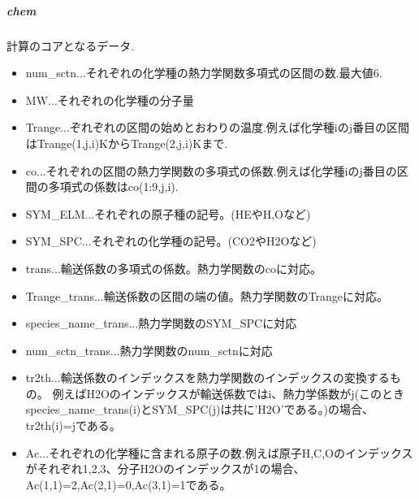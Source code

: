\documentclass{jsarticle}
\begin{document}
\subparagraph{chem}計算のコアとなるデータ.
\begin{itemize}
\item num\_sctn...それぞれの化学種の熱力学関数多項式の区間の数.最大値6.
\item MW...それぞれの化学種の分子量
\item Trange...ぞれぞれの区間の始めとおわりの温度.例えば化学種iのj番目の区間はTrange(1,j,i)KからTrange(2,j,i)Kまで.
\item co...それぞれの区間の熱力学関数の多項式の係数.例えば化学種iのj番目の区間の多項式の係数はco(1:9,j,i).
\item SYM\_ELM...それぞれの原子種の記号。(HEやH,Oなど)
\item SYM\_SPC...それぞれの化学種の記号。(CO2やH2Oなど)
\item trans...輸送係数の多項式の係数。熱力学関数のcoに対応。
\item Trange\_trans...輸送係数の区間の端の値。熱力学関数のTrangeに対応。
\item species\_name\_trans...熱力学関数のSYM\_SPCに対応
\item num\_sctn\_trans...熱力学関数のnum\_sctnに対応
\item tr2th...輸送係数のインデックスを熱力学関数のインデックスの変換するもの。
例えばH2Oのインデックスが輸送係数ではi、熱力学係数がj(このときspecies\_name\_trans(i)とSYM\_SPC(j)は共に'H2O'である。)の場合、
tr2th(i)=jである。
\item Ac...それぞれの化学種に含まれる原子の数.例えば原子H,C,Oのインデックスがそれぞれ1,2,3、分子H2Oのインデックスが1の場合、Ac(1,1)=2,Ac(2,1)=0,Ac(3,1)=1である。
\end{itemize}
\end{document}
